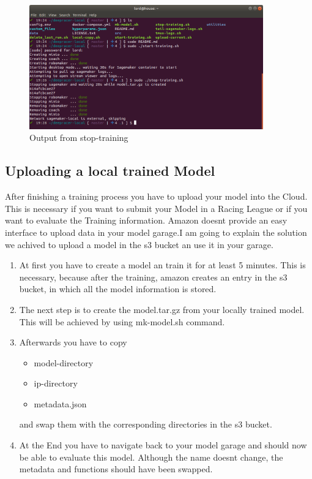 \begin{figure}[H]
    \centering
    \includegraphics[width=0.9\textwidth]{images/deepracer_local_training_stop.png}
    \caption[]{Output from stop-training\footnotemark}
    \label{fig:console-output-stop}
\end{figure}

\subsection{Uploading a local trained Model}
After finishing a training process you have to upload your model into the Cloud. This is necessary if you want to submit your Model in a Racing League or if you want to evaluate the Training information. Amazon doesnt provide an easy interface to upload data in your model garage.I am going to explain the solution we achived to upload a model in the s3 bucket an use it in your garage.

\begin{enumerate}
    \item At first you have to create a model an train it for at least 5 minutes. This is necessary, because after the training, amazon creates an entry in the s3 bucket, in which all the model information is stored.
    \item The next step is to create the model.tar.gz from your locally trained model. This will be achieved by using mk-model.sh command.
    \item Afterwards you have to copy 
    \begin{itemize}
        \item model-directory
        \item ip-directory
        \item metadata.json
    \end{itemize}
    and swap them with the corresponding directories in the s3 bucket.
    \item At the End you have to navigate back to your model garage and should now be able to evaluate this model. Although the name doesnt change, the metadata and functions should have been swapped.
\end{enumerate}

